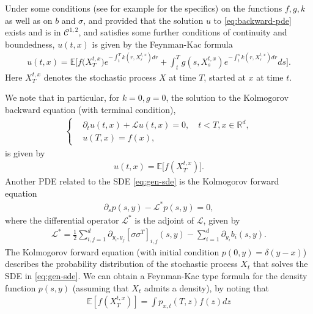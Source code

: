 \documentclass{article}  %
\begin{document}
Under some conditions (see for example \cite{gobet2016monte} for the specifics) on the functions $f, g, k$ as well as on $b$ and $\sigma$, and provided that the solution $u$ to \autoref{eq:backward-pde} exists and is in $\mathcal{C}^{1,2}$, and satisfies some further conditions of continuity and boundedness, $u(t,x)$ is given by the Feynman-Kac formula
%
\begin{align}
    \label{eq:linear-fc} 
    u(t,x) = \mathbb{E}\bigg[ f\big( X_T^{t,x} \big) e^{-\int_t^T k(r,X_r^{t,x})dr} + \int_t^T g(s,X_s^{t,x}) e^{-\int_t^s k(r,X_r^{t,x})dr}ds\bigg].
\end{align} 
%
Here $X_T^{t,x}$ denotes the stochastic process $X$ at time $T$, started at $x$ at time $t$.

We note that in particular, for $k=0,g=0$, the solution to the Kolmogorov backward equation (with terminal condition),
%
\begin{align}
    \label{eq:kolmogorov-backward}
    \begin{cases}
    &\partial_t u(t,x) + \mathcal{L}u(t,x) = 0, \quad t<T,x \in \mathbb{R}^d, \\
    &u(T,x) = f(x),
    \end{cases}
\end{align}
%
is given by 
%
\begin{align}
    u(t,x) = \mathbb{E}\big[ f(X_T^{t,x}) \big]. 
\end{align} 
% 
Another PDE related to the SDE \autoref{eq:gen-sde} is the Kolmogorov forward equation
%
\begin{align} %
    \label{eq:kolmogorov-forward}
    \partial_s p(s,y) - \mathcal{L}^{*}p(s,y) = 0,
\end{align}
%
where the differential operator $\mathcal{L}^{*}$ is the adjoint of $\mathcal{L}$, given by
%
\begin{align}
    \label{eq:adjoint-operator}
     \mathcal{L}^{*} = \frac{1}{2} \sum_{i,j=1}^{d} \partial_{y_i,y_j} [\sigma \sigma^T]_{i,j}(s,y) - \sum_{i=1}^{d} \partial_{y_i}b_i(s,y).
\end{align} 
%
The Kolmogorov forward equation (with initial condition $p(0,y)=\delta(y-x)$) describes the probability distribution of the stochastic process $X_t$ that solves the SDE in \autoref{eq:gen-sde}. We can obtain a Feynman-Kac type formula for the density function $p(s,y)$ (assuming that $X_t$ admits a density), by noting that
%
\begin{align} 
    \mathbb{E}[f(X_T^{t,x})] = \int p_{x,t}(T,z)f(z)dz 
\end{align}
\end{document}
